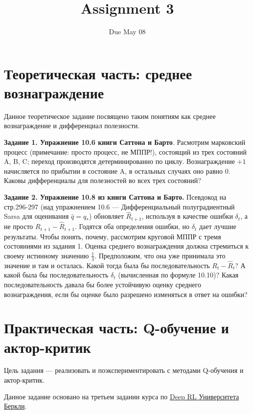 \documentclass[12pt, oneside]{article}
\author{Due May 08}
\title{Assignment 3}
\date{}
\begin{document}
\maketitle
\thispagestyle{fancy}

\section{Теоретическая часть: среднее вознаграждение}

Данное теоретическое задание посвящено таким понятиям как среднее вознаграждение и дифференциал полезности.

\textbf{Задание 1. Упражнение 10.6 книги Саттона и Барто}. Расмотрим марковский процесс (примечание: просто процесс, не МППР!), состоящий из трех состояний A, B, C; переход производятся детерминированно по циклу. Вознаграждение $+1$ начисляется по прибытии в состояние A, в остальных случаях оно равно 0. Каковы дифференциалы для полезностей во всех трех состояний?

\textbf{Задание 2. Упражнение 10.8 из книги Саттона и Барто.} Псевдокод на стр.296-297 (над упражнением 10.6 --- Дифференциальный полуградиентный Sarsa для оценивания $\hat{q} = q_*$) обновляет $\hat{R}_{t+1}$, используя в качестве ошибки $\delta_t$, а не просто $R_{t+1} - \hat{R}_{t+1}$. Годятся оба определения ошибки, но $\delta_t$ дает лучшие результаты. Чтобы понять, почему, рассмотрим круговой МППР с тремя состояниями из задания 1. Оценка среднего вознаграждения должна стремиться к своему истинному значению $\frac{1}{3}$. Предположим, что она уже принимала это значение и там и осталась. Какой тогда была бы последовательность $R_t - \hat{R}_t$? А какой была бы последовательность $\delta_t$ (вычисленная по формуле 10.10)? Какая последовательность давала бы более устойчивую оценку среднего вознаграждения, если бы оценке было разрешено изменяться в ответ на ошибки?

\section{Практическая часть: Q-обучение и актор-критик}

Цель задания --- реализовать и поэкспериментировать с методами Q-обучения и актор-критик.

Данное задание основано на третьем задании курса по \href{http://rail.eecs.berkeley.edu/deeprlcourse/}{Deep RL Университета Беркли}.
\end{document}
